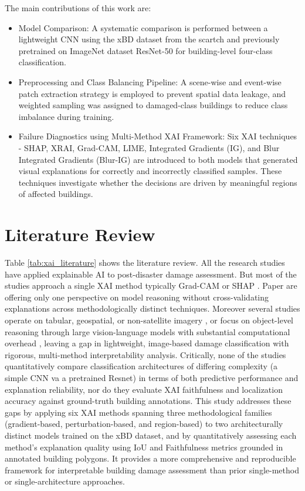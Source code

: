 \documentclass[conference]{IEEEtran}
\begin{document}
The main contributions of this work are:
\begin{itemize}
    \item Model Comparison: A  systematic comparison is performed  between a lightweight CNN using the xBD dataset from the scartch and previously pretrained on ImageNet dataset   ResNet-50 for building-level four-class classification. 
    \item Preprocessing and Class Balancing Pipeline: A scene-wise and event-wise patch extraction strategy is employed to prevent spatial data leakage, and weighted sampling was assigned to damaged-class buildings to reduce class imbalance during training.
    \item Failure Diagnostics using Multi-Method XAI Framework: Six XAI techniques - SHAP, XRAI, Grad-CAM, LIME, Integrated Gradients (IG), and Blur Integrated Gradients (Blur-IG) are introduced to both models that generated visual explanations for correctly and incorrectly classified samples. These techniques investigate whether the decisions are driven by meaningful regions of affected buildings.
\end{itemize}

\section{Literature Review} 

Table \ref{tab:xai_literature} shows the literature review. All the research studies have applied explainable AI to post-disaster damage assessment. But most of the studies approach a single XAI method typically Grad-CAM or SHAP . Paper \cite{lagap2025xai, gu2025seismic, multiscale2026, khorram2021xai} are offering only one perspective on model reasoning without cross-validating explanations across methodologically distinct techniques. Moreover several studies operate on tabular, geospatial, or non-satellite imagery \cite{gu2025seismic}, or focus on object-level reasoning through large vision-language models with substantial computational overhead \cite{wang2026bda}, leaving a gap in lightweight, image-based damage classification with rigorous, multi-method interpretability analysis. Critically, none of the studies quantitatively compare classification architectures of differing complexity (a simple CNN va a  pretrained Resnet) in terms of both predictive performance and explanation reliability, nor do they evaluate XAI faithfulness and localization accuracy against ground-truth building annotations. This study addresses these gaps by applying six XAI methods spanning three methodological families (gradient-based, perturbation-based, and region-based) to two architecturally distinct models trained on the xBD dataset, and by quantitatively assessing each method’s explanation quality using IoU and Faithfulness metrics grounded in annotated building polygons. It provides a more comprehensive and reproducible framework for interpretable building damage assessment than prior single-method or single-architecture approaches.
\end{document}
